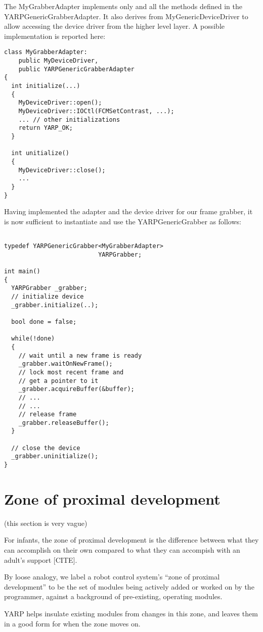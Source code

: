  The MyGrabberAdapter implements only and all the methods defined in the YARPGenericGrabberAdapter. It also derives from MyGenericDeviceDriver to allow accessing the device driver from the higher level layer. A possible implementation is reported here:

{\small \begin{verbatim}
class MyGrabberAdapter: 
	public MyDeviceDriver,
	public YARPGenericGrabberAdapter
{
  int initialize(...)
  {
    MyDeviceDriver::open();
    MyDeviceDriver::IOCtl(FCMSetContrast, ...);
    ... // other initializations
    return YARP_OK;
  }

  int unitialize()
  {
    MyDeviceDriver::close();
    ...
  }
}
\end{verbatim}}

Having implemented the adapter and the device driver for our frame grabber, it is now sufficient to instantiate and use the YARPGenericGrabber as follows:

{\small
\begin{verbatim}

typedef YARPGenericGrabber<MyGrabberAdapter> 
                          YARPGrabber;

int main()
{
  YARPGrabber _grabber;
  // initialize device
  _grabber.initialize(..);
  
  bool done = false;

  while(!done)
  {
    // wait until a new frame is ready
    _grabber.waitOnNewFrame();
    // lock most recent frame and
    // get a pointer to it
    _grabber.acquireBuffer(&buffer);
    // ...
    // ...
    // release frame
    _grabber.releaseBuffer();
  }

  // close the device
  _grabber.uninitialize();
}
\end{verbatim}
}


\section{Zone of proximal development}

(this section is very vague)

For infants, the zone of proximal development is the
difference between what they can accomplish on their
own compared to what they can accompish with an
adult's support [CITE].

By loose analogy, we label a robot control system's ``zone of proximal
development'' to be the set of modules being actively added or worked
on by the programmer, against a background of pre-existing, operating
modules.  

YARP helps insulate existing modules from changes in this zone,
and leaves them in a good form for when the zone moves on.

